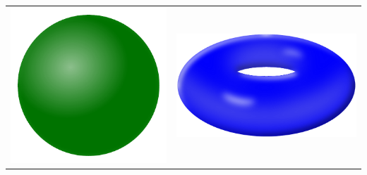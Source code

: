 \begin{center}
  \begin{tabular}{cc}
    \includegraphics[scale=.4]{Pictures/Sphere2.pdf}  & \includegraphics[scale=.4]{Pictures/Torus.pdf}
  \end{tabular}
\end{center}


